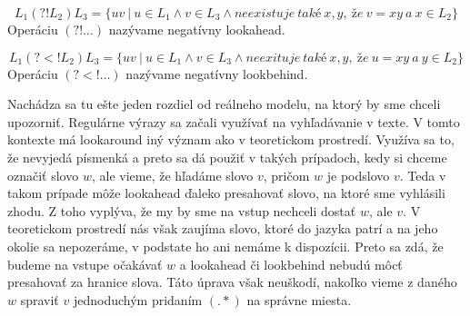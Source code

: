 \begin{df}
$$ L_{1}(?!L_{2})L_{3} = \lbrace uv ~|~ u \in L_{1} \land v \in L_{3} \land neexistuje~také~x,y,~že~v=xy~a~x \in L_2 \rbrace $$ Operáciu $(?!\dots)$ nazývame negatívny lookahead.
\end{df}

\begin{df}
$$ L_{1}(?<!L_{2})L_{3} = \lbrace uv ~|~ u \in L_{1} \land v \in L_{3} \land neexituje~také~x,y,~že~u=xy~a~y \in L_2 \rbrace $$ Operáciu $(?<!\dots)$ nazývame negatívny lookbehind.
\end{df}

Nachádza sa tu ešte jeden rozdiel od reálneho modelu, na ktorý by sme chceli upozorniť. Regulárne výrazy sa začali využívať na vyhľadávanie v texte. V tomto kontexte má lookaround iný význam ako v teoretickom prostredí. Využíva sa to, že nevyjedá písmenká a preto sa dá použiť v takých prípadoch, kedy si chceme označiť slovo $w$, ale vieme, že hľadáme slovo $v$, pričom $w$ je podslovo $v$. Teda v takom prípade môže lookahead ďaleko presahovať slovo, na ktoré sme vyhlásili zhodu. Z toho vyplýva, že my by sme na vstup nechceli dostať $w$, ale $v$. V teoretickom prostredí nás však zaujíma slovo, ktoré do jazyka patrí a na jeho okolie sa nepozeráme, v podstate ho ani nemáme k dispozícii. Preto sa zdá, že budeme na vstupe očakávať $w$ a lookahead či lookbehind nebudú môcť presahovať za hranice slova. Táto úprava však neuškodí, nakoľko vieme z daného $w$ spraviť $v$ jednoduchým pridaním $(.*)$ na správne miesta.
